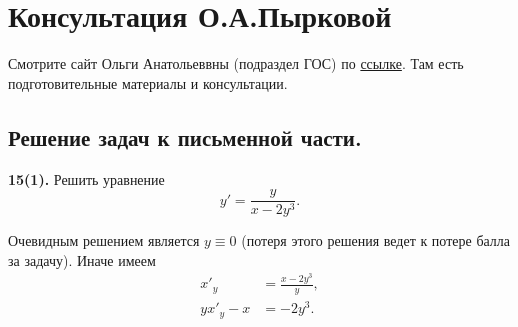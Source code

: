 \newpage
\section{Консультация О.А.Пырковой}

Смотрите сайт Ольги Анатольеввны (подраздел ГОС) по \href{https://www.pyrkovaoa-fizteh.ru/ГОС-по-математике/}{ссылке}. Там есть подготовительные материалы и консультации. 











\subsection{Решение задач к письменной части.}

\begin{task}
    \textbf{15(1).} Решить уравнение
    \begin{equation*}
        y' = \frac{y}{x - 2y^3}.
    \end{equation*}
\end{task}

Очевидным решением является $y \equiv 0$ (потеря этого решения ведет к потере балла за задачу). Иначе имеем
\begin{align*}
        x'_y &= \frac{x - 2y^3}{y}, \\
        yx'_y - x &= -2y^3.
\end{align*}


